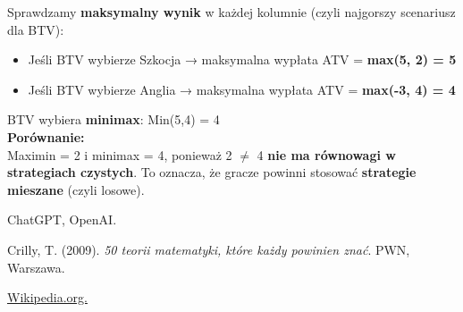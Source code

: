 \documentclass[12pt]{article}
\begin{document}
Sprawdzamy \textbf{maksymalny wynik} w każdej kolumnie (czyli najgorszy scenariusz dla BTV):
\begin{itemize}
\item Jeśli BTV wybierze Szkocja → maksymalna wypłata ATV = \textbf{max(5, 2) = 5}
\item Jeśli BTV wybierze Anglia → maksymalna wypłata ATV = \textbf{max(-3, 4) = 4}
\end{itemize}
BTV wybiera \textbf{minimax}: Min(5,4) = 4
\\
\textbf{Porównanie:}
\
\\
Maximin = 2 i minimax = 4,
ponieważ 2 $ \neq $ 4 \textbf{nie ma równowagi w strategiach czystych}.
To oznacza, że gracze powinni stosować \textbf{strategie mieszane} (czyli losowe).

\begin{thebibliography}{9}

ChatGPT, OpenAI.

Crilly, T. (2009). \textit{50 teorii matematyki, które każdy powinien znać}. PWN, Warszawa.

\href{https://pl.wikipedia.org/wiki/Teoria\_gier}{Wikipedia.org.}

\end{thebibliography}
\end{document}
